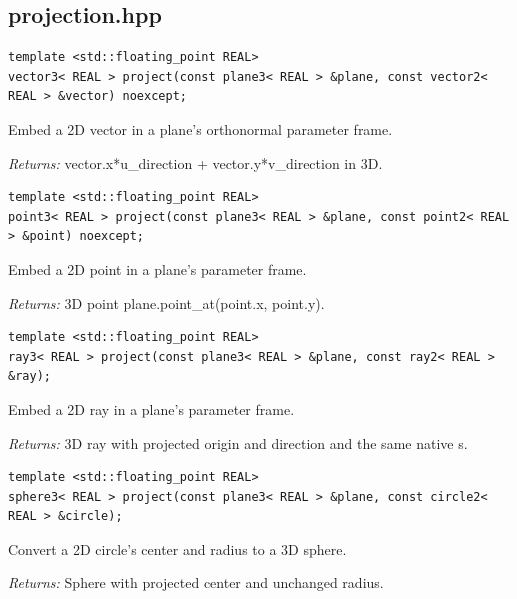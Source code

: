 \subsection{projection.hpp}
\par\noindent\begin{minipage}{\linewidth}
\begin{lstlisting}[style=apireference]
template <std::floating_point REAL>
vector3< REAL > project(const plane3< REAL > &plane, const vector2< REAL > &vector) noexcept;
\end{lstlisting}
{\footnotesize Embed a 2D vector in a plane's orthonormal parameter frame.\par}
{\footnotesize\textit{Returns:} vector.x*u\_direction + vector.y*v\_direction in 3D.\par}
\end{minipage}\par\vspace{1pt}
\par\noindent\begin{minipage}{\linewidth}
\begin{lstlisting}[style=apireference]
template <std::floating_point REAL>
point3< REAL > project(const plane3< REAL > &plane, const point2< REAL > &point) noexcept;
\end{lstlisting}
{\footnotesize Embed a 2D point in a plane's parameter frame.\par}
{\footnotesize\textit{Returns:} 3D point plane.point\_at(point.x, point.y).\par}
\end{minipage}\par\vspace{1pt}
\par\noindent\begin{minipage}{\linewidth}
\begin{lstlisting}[style=apireference]
template <std::floating_point REAL>
ray3< REAL > project(const plane3< REAL > &plane, const ray2< REAL > &ray);
\end{lstlisting}
{\footnotesize Embed a 2D ray in a plane's parameter frame.\par}
{\footnotesize\textit{Returns:} 3D ray with projected origin and direction and the same native s.\par}
\end{minipage}\par\vspace{1pt}
\par\noindent\begin{minipage}{\linewidth}
\begin{lstlisting}[style=apireference]
template <std::floating_point REAL>
sphere3< REAL > project(const plane3< REAL > &plane, const circle2< REAL > &circle);
\end{lstlisting}
{\footnotesize Convert a 2D circle's center and radius to a 3D sphere.\par}
{\footnotesize\textit{Returns:} Sphere with projected center and unchanged radius.\par}
\end{minipage}\par\vspace{1pt}
